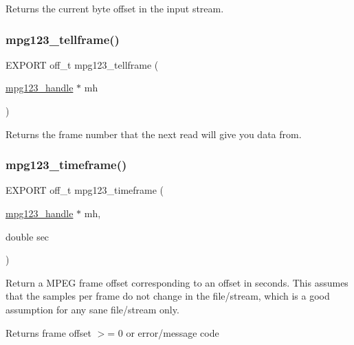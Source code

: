 Returns the current byte offset in the input stream. \mbox{\label{group__mpg123__seek_gac9e7addd98557c3bb784a7b93b3eeb17}} 
\subsubsection{\texorpdfstring{mpg123\+\_\+tellframe()}{mpg123\_tellframe()}}
{\footnotesize\ttfamily E\+X\+P\+O\+RT off\+\_\+t mpg123\+\_\+tellframe (\begin{DoxyParamCaption}\item[{\hyperlink{group__mpg123__init_ga6728e2839a395f3a07d4514da659faca}{mpg123\+\_\+handle} $\ast$}]{mh }\end{DoxyParamCaption})}

Returns the frame number that the next read will give you data from. \mbox{\label{group__mpg123__seek_gaee6dc54beea9eae0e196a357ed55cd5f}} 
\subsubsection{\texorpdfstring{mpg123\+\_\+timeframe()}{mpg123\_timeframe()}}
{\footnotesize\ttfamily E\+X\+P\+O\+RT off\+\_\+t mpg123\+\_\+timeframe (\begin{DoxyParamCaption}\item[{\hyperlink{group__mpg123__init_ga6728e2839a395f3a07d4514da659faca}{mpg123\+\_\+handle} $\ast$}]{mh,  }\item[{double}]{sec }\end{DoxyParamCaption})}

Return a M\+P\+EG frame offset corresponding to an offset in seconds. This assumes that the samples per frame do not change in the file/stream, which is a good assumption for any sane file/stream only. \begin{DoxyReturn}{Returns}
frame offset $>$= 0 or error/message code 
\end{DoxyReturn}
